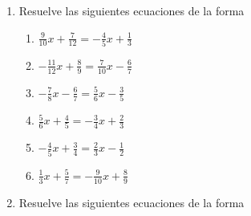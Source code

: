 \documentclass[12pt]{article}
\theoremstyle{plain}
\theoremstyle{definition}
\theoremstyle{remark}
\begin{document}
{\begin{enumerate}
  \begin{enumerate}
  \def\labelenumii{\roman{enumii}.}
  \item
    \(\frac{2}{3}x - \frac{5}{4} = \frac{7}{6}\)
  \item
    \(\frac{4}{5}x - \frac{2}{3} = -\frac{1}{6}\)
  \item
    \(\frac{11}{12}x + \frac{10}{11} = -\frac{9}{10}\)
  \item
    \(\frac{3}{4}x - \frac{4}{5} = -\frac{1}{2}\)
  \item
    \(\frac{6}{7}x + \frac{8}{9} = -\frac{10}{11}\)
  \item
    \(\frac{9}{10}x + \frac{1}{3} = -\frac{5}{6}\)
  \end{enumerate}
\item
  Resuelve las siguientes ecuaciones de la forma

  \begin{enumerate}
  \def\labelenumii{\roman{enumii}.}
  \setcounter{enumii}{2}
  \item
    \(\frac{9}{10}x + \frac{7}{12} = -\frac{4}{5}x + \frac{1}{3}\)
  \item
    \(-\frac{11}{12}x + \frac{8}{9} = \frac{7}{10}x - \frac{6}{7}\)
  \item
    \(-\frac{7}{8}x - \frac{6}{7} = \frac{5}{6}x - \frac{3}{5}\)
  \item
    \(\frac{5}{6}x + \frac{4}{5} = -\frac{3}{4}x + \frac{2}{3}\)
  \item
    \(-\frac{4}{5}x + \frac{3}{4} = \frac{2}{3}x - \frac{1}{2}\)
  \item
    \(\frac{1}{3}x + \frac{5}{7} = -\frac{9}{10}x + \frac{8}{9}\)
  \end{enumerate}
\item
  Resuelve las siguientes ecuaciones de la forma


\end{enumerate}}
\end{document}
